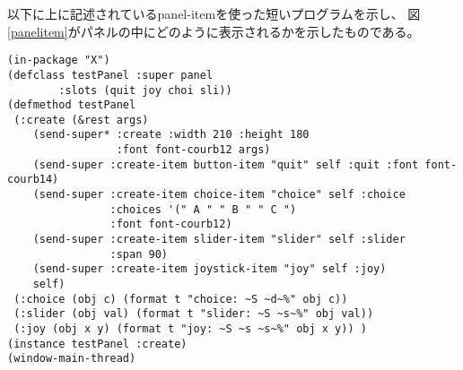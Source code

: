 \begin{refdesc}



\end{refdesc}

以下に上に記述されているpanel-itemを使った短いプログラムを示し、
図 \ref{panelitem}がパネルの中にどのように表示されるかを示したものである。

\begin{verbatim}
(in-package "X")
(defclass testPanel :super panel
        :slots (quit joy choi sli))
(defmethod testPanel
 (:create (&rest args)
    (send-super* :create :width 210 :height 180 
                 :font font-courb12 args)
    (send-super :create-item button-item "quit" self :quit :font font-courb14)
    (send-super :create-item choice-item "choice" self :choice
                :choices '(" A " " B " " C ")
                :font font-courb12)
    (send-super :create-item slider-item "slider" self :slider
                :span 90)
    (send-super :create-item joystick-item "joy" self :joy)
    self)
 (:choice (obj c) (format t "choice: ~S ~d~%" obj c))
 (:slider (obj val) (format t "slider: ~S ~s~%" obj val))
 (:joy (obj x y) (format t "joy: ~S ~s ~s~%" obj x y)) )
(instance testPanel :create)
(window-main-thread)
\end{verbatim}

